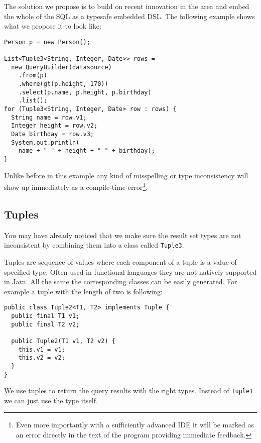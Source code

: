 \documentclass{sig-alternate}
\begin{document}
The solution we propose is to build on recent innovation in the area and embed the whole of the SQL as a typesafe embedded DSL. The following example shows what we propose it to look like:

\begin{verbatim}
Person p = new Person(); 

List<Tuple3<String, Integer, Date>> rows =
  new QueryBuilder(datasource)
    .from(p)
    .where(gt(p.height, 170))
    .select(p.name, p.height, p.birthday)
    .list();
for (Tuple3<String, Integer, Date> row : rows) {
  String name = row.v1;
  Integer height = row.v2;
  Date birthday = row.v3;
  System.out.println(
    name + " " + height + " " + birthday);
}
\end{verbatim}

Unlike before in this example any kind of misspelling or type inconsistency will show up immediately as a compile-time error\footnote{Even more importantly with a sufficiently advanced IDE it will be marked as an error directly in the text of the program providing immediate feedback.}.

\subsection{Tuples}

You may have already noticed that we make sure the result set types are not inconsistent by combining them into a class called \verb!Tuple3!.

Tuples are sequence of values where each component of a tuple is a value of specified type. Often used in functional languages they are not natively supported in Java. All the same the corresponding classes can be easily generated. For example a tuple with the length of two is following:

\begin{verbatim}
public class Tuple2<T1, T2> implements Tuple {
  public final T1 v1;
  public final T2 v2;

  public Tuple2(T1 v1, T2 v2) {
    this.v1 = v1;
    this.v2 = v2;
  }		
}
\end{verbatim}

We use tuples to return the query results with the right types. Instead of \verb!Tuple1! we can just use the type itself.

\end{document}
